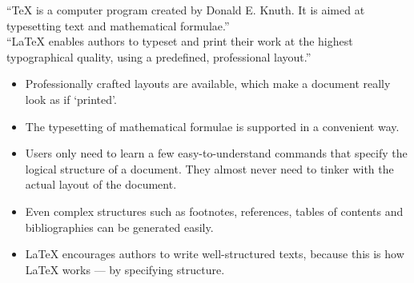 ``\TeX{} is a computer program created by Donald E. Knuth. It is aimed at
typesetting text and mathematical formulae.'' \\
``\LaTeX{} enables authors to typeset and print their work at the highest
typographical quality, using a predefined, professional layout.''






\begin{itemize}
	\renewcommand{\labelitemi}{\(+\)}
	\item Professionally crafted layouts are available, which make a document
	really look as if `printed'.
	\item The typesetting of mathematical formulae is supported in a convenient
	way.
	\item Users only need to learn a few easy-to-understand commands that
	specify the logical structure of a document. They almost never need to
	tinker with the actual layout of the document.
	\item Even complex structures such as footnotes, references, tables of
	contents and bibliographies can be generated easily.
	\item \LaTeX{} encourages authors to write well-structured texts, because
	this is how \LaTeX{}  works --- by specifying structure.
\end{itemize}

